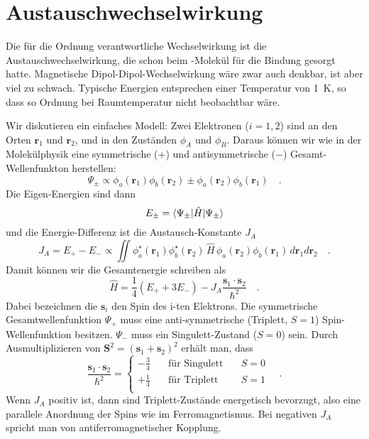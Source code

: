 \section*{Austauschwechselwirkung}

Die für die Ordnung verantwortliche Wechselwirkung ist die Austauschwechselwirkung, die schon beim -Molekül für die Bindung gesorgt hatte. Magnetische Dipol-Dipol-Wechselwirkung wäre zwar auch denkbar, ist aber viel zu schwach. Typische Energien entsprechen einer Temperatur von 1~K, so dass so Ordnung bei Raumtemperatur nicht beobachtbar wäre.

Wir diskutieren ein einfaches Modell: Zwei Elektronen ($i=1,2$) sind an den Orten $\bm{r}_1$ und $\bm{r}_2$, und in den Zuständen $\phi_A$ und $\phi_B$. Daraus können wir wie in der Molekülphysik eine symmetrische ($+$) und antisymmetrische ($-$) Gesamt-Wellenfunkton herstellen:
\begin{equation}
    \Psi_\pm  \propto \phi_a(\bm{r}_1) \phi_b(\bm{r}_2) \pm \phi_a(\bm{r}_2) \phi_b(\bm{r}_1)  \quad .
\end{equation}
Die Eigen-Energien sind dann 
\begin{equation}
    E_\pm = \braket{\Psi_\pm | \hat{H} | \Psi_\pm}
\end{equation}
und die Energie-Differenz ist die Austausch-Konstante $J_A$
\begin{equation}
    J_A = E_+ - E_-  \propto \iint \phi_a^\star(\bm{r}_1) \phi_b^\star(\bm{r}_2)  \,
    \hat{H} \, \phi_a(\bm{r}_2) \phi_b(\bm{r}_1) \, d\bm{r}_1   d\bm{r}_2   \quad .
\end{equation}
Damit können wir die Gesamtenergie schreiben als
\begin{equation}
    \hat{H} = \frac{1}{4} (E_+ + 3 E_-) - J_A \frac{\bm{s}_1 \cdot \bm{s}_2}{\hbar^2}  \quad .
    \label{eq:7_H_austausch_2e}
\end{equation}
Dabei bezeichnen die $\bm{s}_i$ den Spin des i-ten Elektrons. Die symmetrische Gesamtwellenfunktion $\Psi_+$ muss eine anti-symmetrische (Triplett, $S=1$) Spin-Wellenfunktion besitzen. $\Psi_-$ muss ein Singulett-Zustand ($S=0$) sein.  Durch Ausmultiplizieren von $\bm{S}^2 = (\bm{s}_1  + \bm{s}_2 )^2$ erhält man, dass
\begin{equation}
    \frac{\bm{s}_1 \cdot \bm{s}_2}{\hbar^2}
    = \left\{ \begin{matrix}
        - \frac{3}{4} \quad & \text{für Singulett} \quad &S=0 \\
        + \frac{1}{4} \quad & \text{für Triplett} \quad & S=1 \\
    \end{matrix}
    \right.   \quad .
\end{equation} 
Wenn $J_A$ positiv ist, dann sind Triplett-Zustände energetisch bevorzugt, also eine parallele Anordnung der Spins wie im Ferromagnetismus. Bei negativen $J_A$ spricht man von antiferromagnetischer Kopplung.

